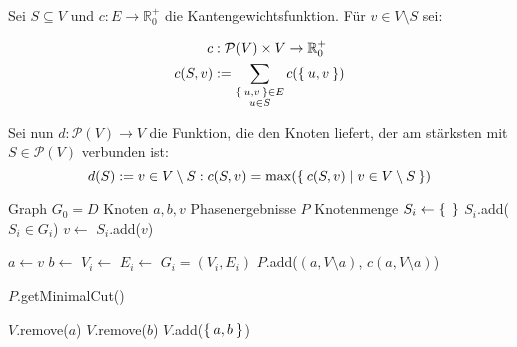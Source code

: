 \documentclass{article}
\begin{document}
\begin{preview}
    Sei $S \subseteq V$ und $c:E\rightarrow\mathbb{R}_0^+$ die 
    Kantengewichtsfunktion.
    Für $v \in V \setminus S$ sei:

        \begin{align*}
            c &:\mathcal{P}(V) \times V \rightarrow \mathbb{R}_0^+\\
        c(S,v) &:= \sum_{\substack{\Set{u,v} \in E\\ u \in S}} c(\Set{u,v})
        \end{align*}

    Sei nun $d: \mathcal{P}(V) \rightarrow V$ die Funktion, die den 
    Knoten liefert, der am stärksten mit $S \in \mathcal{P}(V)$ 
    verbunden ist:
        \[d(S) := v \in V \setminus S: c(S, v) = \max(\Set{c(S,v) | v \in V \setminus S})\]

    \begin{algorithm}[H]
        \begin{algorithmic}
                \State Graph $G_0 = D$
                \State Knoten $a,b,v$
                \State Phasenergebnisse $P$ 
                    \State Knotenmenge $S_i \gets \Set{}$
                    \State $S_i$.add($S_i \in G_i$) 
                        \State $v \gets$ 
                        \State $S_i$.add($v$)
                    \EndWhile

                    \State $a \gets v$
                    \State $b \gets$ 
                    \State $V_i \gets$ 
                    \State $E_i \gets$ 
                    \State $G_i = (V_i, E_i)$
                    \State $P$.add($(a, V \setminus a)$, $c(a, V \setminus a)$)
                \EndFor

                \State \Return $P$.getMinimalCut()
            \EndFunction

                \State $V$.remove($a$)
                \State $V$.remove($b$)
                \State {}
                \State $V$.add($\Set{a, b}$)
            \EndFunction


\end{algorithmic}
\end{algorithm}
\end{preview}
\end{document}
